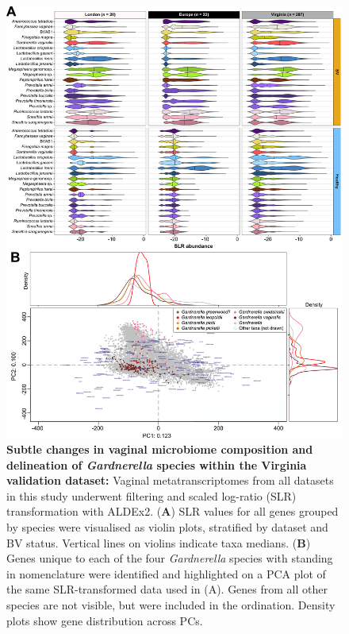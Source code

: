 \documentclass[sn-mathphys,Numbered]{sn-jnl}%
\begin{document}
\begin{figure}[H]
    \centering
    \includegraphics[scale=1.15]{0_multipanel_fig4_revised.png}
    \caption{\textbf{Subtle changes in vaginal microbiome composition and delineation of \textit{Gardnerella} species within the Virginia validation dataset:} Vaginal metatranscriptomes from all datasets in this study underwent filtering and scaled log-ratio (SLR) transformation with ALDEx2. (\textbf{A}) SLR values for all genes grouped by species were visualised as violin plots, stratified by dataset and BV status. Vertical lines on violins indicate taxa medians. (\textbf{B}) Genes unique to each of the four \textit{Gardnerella} species with standing in nomenclature were identified and highlighted on a PCA plot of the same SLR-transformed data used in (A). Genes from all other species are not visible, but were included in the ordination. Density plots show gene distribution across PCs.}
    \label{fig:figViolinGardnerella}
\end{figure}
\end{document}
